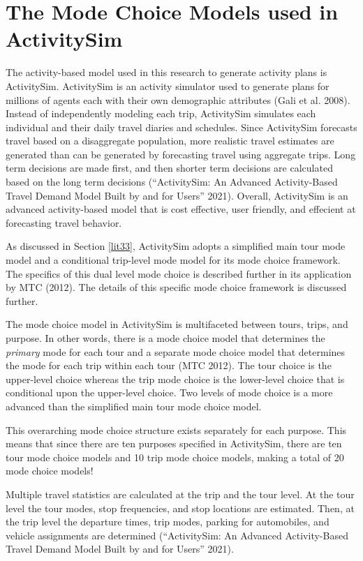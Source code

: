 \documentclass[12pt, oneside, openright]{byuthesis}
\begin{document}
\hypertarget{lit4}{%
\section{The Mode Choice Models used in ActivitySim}\label{lit4}}

The activity-based model used in this research to generate activity plans is ActivitySim. ActivitySim is an activity simulator used to generate plans for millions of agents each with their own demographic attributes (Gali et al. 2008). Instead of independently modeling each trip, ActivitySim simulates each individual and their daily travel diaries and schedules. Since ActivitySim forecasts travel based on a disaggregate population, more realistic travel estimates are generated than can be generated by forecasting travel using aggregate trips. Long term decisions are made first, and then shorter term decisions are calculated based on the long term decisions ({``ActivitySim: An Advanced Activity-Based Travel Demand Model Built by and for Users''} 2021). Overall, ActivitySim is an advanced activity-based model that is cost effective, user friendly, and effecient at forecasting travel behavior.

As discussed in Section \ref{lit33}, ActivitySim adopts a simplified main tour mode model and a conditional trip-level mode model for its mode choice framework. The specifics of this dual level mode choice is described further in its application by MTC (2012). The details of this specific mode choice framework is discussed further.

The mode choice model in ActivitySim is multifaceted between tours, trips, and purpose. In other words, there is a mode choice model that determines the \emph{primary} mode for each tour and a separate mode choice model that determines the mode for each trip within each tour (MTC 2012). The tour choice is the upper-level choice whereas the trip mode choice is the lower-level choice that is conditional upon the upper-level choice. Two levels of mode choice is a more advanced than the simplified main tour mode choice model.

This overarching mode choice structure exists separately for each purpose. This means that since there are ten purposes specified in ActivitySim, there are ten tour mode choice models and 10 trip mode choice models, making a total of 20 mode choice models!

Multiple travel statistics are calculated at the trip and the tour level. At the tour level the tour modes, stop frequencies, and stop locations are estimated. Then, at the trip level the departure times, trip modes, parking for automobiles, and vehicle assignments are determined ({``ActivitySim: An Advanced Activity-Based Travel Demand Model Built by and for Users''} 2021).
\end{document}
